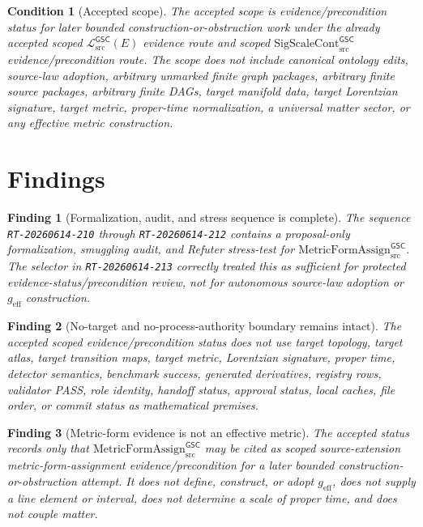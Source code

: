 \documentclass[11pt]{article}
\newcommand{\MetricData}{\mathcal{L}_{\mathrm{src}}^{\mathsf{GSC}}}
\newcommand{\geff}{g_{\mathrm{eff}}}
\newcommand{\SigScaleCont}{\mathrm{SigScaleCont}_{\mathrm{src}}^{\mathsf{GSC}}}
\newcommand{\MetricFormAssign}{\mathrm{MetricFormAssign}_{\mathrm{src}}^{\mathsf{GSC}}}
\newtheorem{finding}{Finding}
\newtheorem{condition}{Condition}
\begin{document}
\begin{condition}[Accepted scope]
The accepted scope is evidence/precondition status for later bounded
construction-or-obstruction work under the already accepted scoped
\(\MetricData(E)\) evidence route and scoped \(\SigScaleCont\)
evidence/precondition route. The scope does not include canonical ontology
edits, source-law adoption, arbitrary unmarked finite graph packages,
arbitrary finite source packages, arbitrary finite DAGs, target manifold data,
target Lorentzian signature, target metric, proper-time normalization, a
universal matter sector, or any effective metric construction.
\end{condition}

\section{Findings}

\begin{finding}[Formalization, audit, and stress sequence is complete]
The sequence \texttt{RT-20260614-210} through \texttt{RT-20260614-212}
contains a proposal-only formalization, smuggling audit, and Refuter
stress-test for \(\MetricFormAssign\). The selector in
\texttt{RT-20260614-213} correctly treated this as sufficient for protected
evidence-status/precondition review, not for autonomous source-law adoption or
\(\geff\) construction.
\end{finding}

\begin{finding}[No-target and no-process-authority boundary remains intact]
The accepted scoped evidence/precondition status does not use target topology,
target atlas, target transition maps, target metric, Lorentzian signature,
proper time, detector semantics, benchmark success, generated derivatives,
registry rows, validator PASS, role identity, handoff status, approval status,
local caches, file order, or commit status as mathematical premises.
\end{finding}

\begin{finding}[Metric-form evidence is not an effective metric]
The accepted status records only that \(\MetricFormAssign\) may be cited as
scoped source-extension metric-form-assignment evidence/precondition for a
later bounded construction-or-obstruction attempt. It does not define,
construct, or adopt \(\geff\), does not supply a line element or interval,
does not determine a scale of proper time, and does not couple matter.
\end{finding}
\end{document}
